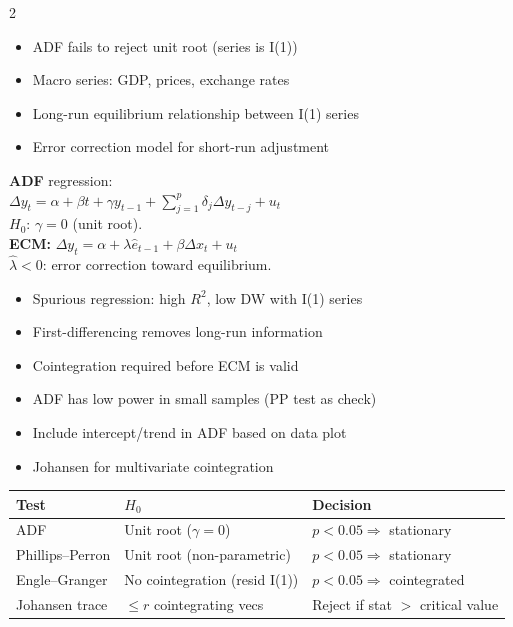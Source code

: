 \documentclass[10pt,a4paper]{article}
\begin{document}
\begin{multicols}{2}

\begin{tcolorbox}[when]
\begin{itemize}
  \item ADF fails to reject unit root (series is I(1))
  \item Macro series: GDP, prices, exchange rates
  \item Long-run equilibrium relationship between I(1) series
  \item Error correction model for short-run adjustment
\end{itemize}
\end{tcolorbox}

\begin{tcolorbox}[key]
\textbf{ADF} regression:\\
$\Delta y_t = \alpha + \beta t + \gamma y_{t-1} + \sum_{j=1}^p \delta_j \Delta y_{t-j} + u_t$\\
$H_0$: $\gamma = 0$ (unit root).\\[4pt]
\textbf{ECM:} $\Delta y_t = \alpha + \lambda \hat{e}_{t-1} + \beta \Delta x_t + u_t$\\
$\hat\lambda < 0$: error correction toward equilibrium.
\end{tcolorbox}

\columnbreak

\begin{tcolorbox}[watchout]
\begin{itemize}
  \item Spurious regression: high $R^2$, low DW with I(1) series
  \item First-differencing removes long-run information
  \item Cointegration required before ECM is valid
  \item ADF has low power in small samples (PP test as check)
  \item Include intercept/trend in ADF based on data plot
  \item Johansen for multivariate cointegration
\end{itemize}
\end{tcolorbox}

\end{multicols}

\begin{tcolorbox}[tests]
\begin{tabularx}{\linewidth}{lXl}
\toprule
\textbf{Test} & \textbf{$H_0$} & \textbf{Decision} \\
\midrule
ADF & Unit root ($\gamma = 0$) & $p < 0.05 \Rightarrow$ stationary \\
\rowcolor{RowGray}
Phillips--Perron & Unit root (non-parametric) & $p < 0.05 \Rightarrow$ stationary \\
Engle--Granger & No cointegration (resid I(1)) & $p < 0.05 \Rightarrow$ cointegrated \\
\rowcolor{RowGray}
Johansen trace & $\leq r$ cointegrating vecs & Reject if stat $>$ critical value \\
\bottomrule
\end{tabularx}
\end{tcolorbox}
\end{document}
